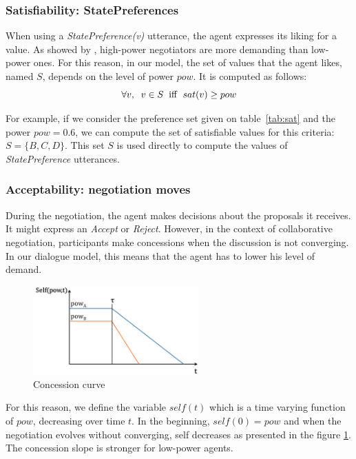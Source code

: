 \documentclass[conference, letterpaper]{IEEEtran}
\begin{document}
	\subsubsection{Satisfiability: StatePreferences}
	\label{sec:sat}
	When using a \emph{StatePreference(v)} utterance, the agent expresses its liking for a value. As showed by \cite{de1995impact}, high-power negotiators are more demanding than low-power ones. For this reason, in our model, the set of values that the agent likes, named $S$, depends on the level of power $pow$. It is computed as follows:
	\begin{equation}
	\forall v,\hspace{2mm} v\in S\hspace{2mm}\mathrm{iff}\hspace{2mm}sat(v) \geq pow
	\end{equation}
	
	For example, if we consider the preference set given on table~\ref{tab:sat} and the power $pow=0.6$, we can compute the set of satisfiable values for this criteria: $S = \{B, C, D\}$. This set $S$ is used directly to compute the values of \emph{StatePreference} utterances.
	
	\subsubsection{Acceptability: negotiation moves}
	During the negotiation, the agent makes decisions about the proposals it receives. It might express an \emph{Accept} or \emph{Reject}. However, in the context of collaborative negotiation, participants make concessions when the discussion is not converging. In our dialogue model, this means that the agent has to lower his level of demand.
	
	\begin{figure}[t]
		\includegraphics[width=2.5in]{figs/sv3.png}
		\caption{\label{fig:conc}Concession curve}
	\end{figure} 
	
	For this reason, we define the variable $self(t)$ which is a time varying function of $pow$, decreasing over time $t$. In the beginning, $self(0) = pow$ and when the negotiation evolves without converging, self decreases as presented in the figure \ref{fig:conc}. The concession slope is stronger for low-power agents.
	
\end{document}
